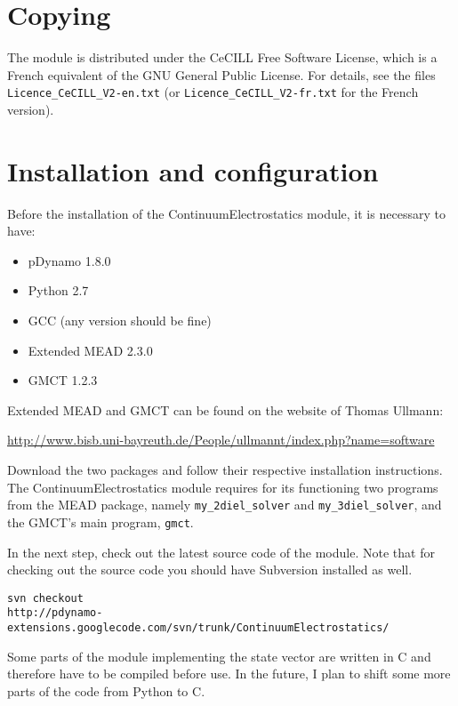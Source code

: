 \documentclass[a4paper,11pt]{article}
\newcommand{\modulename}{ContinuumElectrostatics\xspace}
\begin{document}
\section{Copying}
The module is distributed under the CeCILL Free Software License, which is
a French equivalent of the GNU General Public License.
%
For details, see the files \texttt{Licence\_CeCILL\_V2-en.txt} (or 
\texttt{Licence\_CeCILL\_V2-fr.txt} for the French version).


\section{Installation and configuration}
Before the installation of the \modulename module, it is necessary 
to have:
\begin{itemize}
  \setlength{\itemsep}{2pt}
  \item pDynamo 1.8.0
  \item Python 2.7
  \item GCC (any version should be fine)
  \item Extended MEAD 2.3.0
  \item GMCT 1.2.3
\end{itemize}
%
Extended MEAD and GMCT can be found on the website of Thomas Ullmann:

\url{http://www.bisb.uni-bayreuth.de/People/ullmannt/index.php?name=software}

Download the two packages and follow their respective installation 
instructions.
%
The \modulename module requires for its functioning two programs 
from the MEAD package, namely \texttt{my\_2diel\_solver} and \texttt{my\_3diel\_solver}, 
and the GMCT's main program, \texttt{gmct}.

\bigskip
In the next step, check out the latest source code of the module.
%
Note that for checking out the source code you should have Subversion installed 
as well.

\texttt{svn checkout \\
http://pdynamo-extensions.googlecode.com/svn/trunk/ContinuumElectrostatics/}


\bigskip
Some parts of the module implementing the state vector are written in C and
therefore have to be compiled before use. In the future, I plan to shift some 
more parts of the code from Python to C.
\end{document}
